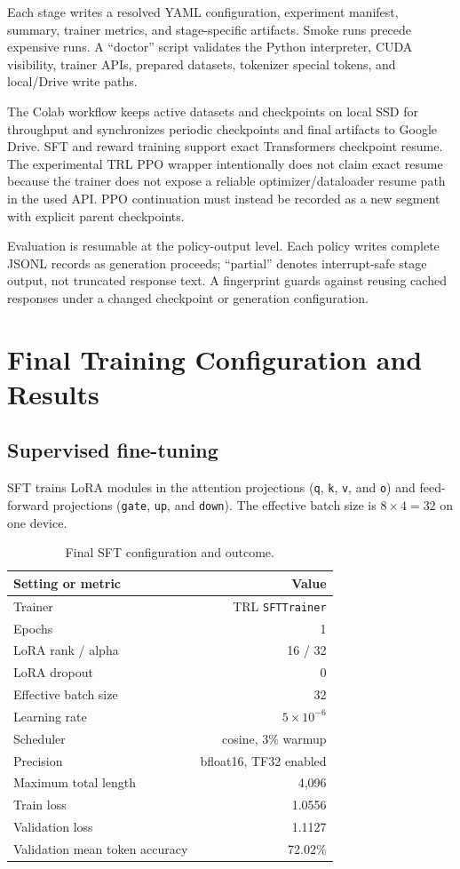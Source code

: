 \documentclass[11pt]{article}
\newcommand{\trl}{\textsc{TRL}}
\begin{document}
Each stage writes a resolved YAML configuration, experiment manifest, summary,
trainer metrics, and stage-specific artifacts. Smoke runs precede expensive
runs. A ``doctor'' script validates the Python interpreter, CUDA visibility,
trainer APIs, prepared datasets, tokenizer special tokens, and local/Drive
write paths.

The Colab workflow keeps active datasets and checkpoints on local SSD for
throughput and synchronizes periodic checkpoints and final artifacts to Google
Drive. SFT and reward training support exact Transformers checkpoint resume.
The experimental \trl{} PPO wrapper intentionally does not claim exact resume
because the trainer does not expose a reliable optimizer/dataloader resume
path in the used API. PPO continuation must instead be recorded as a new
segment with explicit parent checkpoints.

Evaluation is resumable at the policy-output level. Each policy writes
complete JSONL records as generation proceeds; ``partial'' denotes
interrupt-safe stage output, not truncated response text. A fingerprint guards
against reusing cached responses under a changed checkpoint or generation
configuration.

\section{Final Training Configuration and Results}

\subsection{Supervised fine-tuning}

SFT trains LoRA modules in the attention projections
(\texttt{q}, \texttt{k}, \texttt{v}, and \texttt{o}) and feed-forward
projections (\texttt{gate}, \texttt{up}, and \texttt{down}). The effective
batch size is $8\times 4=32$ on one device.

\begin{table}[H]
\centering
\caption{Final SFT configuration and outcome.}
\label{tab:sft}
\begin{tabularx}{0.88\textwidth}{@{}Y r@{}}
\toprule
\textbf{Setting or metric} & \textbf{Value}\\
\midrule
Trainer & \trl{} \texttt{SFTTrainer}\\
Epochs & 1\\
LoRA rank / alpha & 16 / 32\\
LoRA dropout & 0\\
Effective batch size & 32\\
Learning rate & $5\times 10^{-6}$\\
Scheduler & cosine, 3\% warmup\\
Precision & bfloat16, TF32 enabled\\
Maximum total length & 4,096\\
Train loss & 1.0556\\
Validation loss & 1.1127\\
Validation mean token accuracy & 72.02\%\\
\bottomrule
\end{tabularx}
\end{table}
\end{document}
